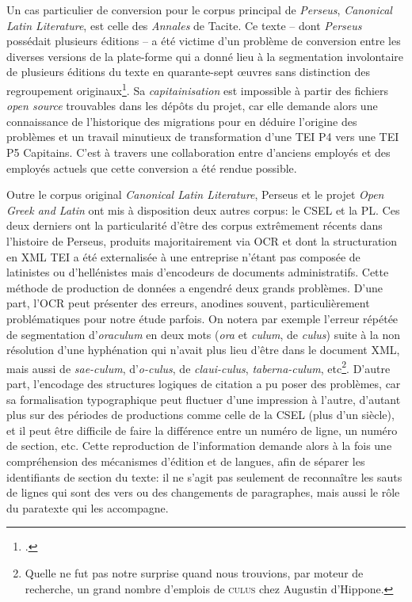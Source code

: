 Un cas particulier de conversion pour le corpus principal de \textit{Perseus}, \textit{Canonical Latin Literature}, est celle des \textit{Annales} de Tacite. Ce texte -- dont \textit{Perseus} possédait plusieurs éditions -- a été victime d'un problème de conversion entre les diverses versions de la plate-forme qui a donné lieu à la segmentation involontaire de plusieurs éditions du texte en quarante-sept œuvres sans distinction des regroupement originaux\footcite{noauthor_canonical_latinlitphi0660phi003perseus_lat2xml_nodate, clerice_phi0914phi001lat2_nodate}. Sa \textit{capitainisation} est impossible à partir des fichiers \textit{open source} trouvables dans les dépôts du projet, car elle demande alors une connaissance de l'historique des migrations pour en déduire l'origine des problèmes et un travail minutieux de transformation d'une TEI P4 vers une TEI P5 Capitains. C'est à travers une collaboration entre d'anciens employés et des employés actuels que cette conversion a été rendue possible.

Outre le corpus original \textit{Canonical Latin Literature}, Perseus et le projet \textit{Open Greek and Latin} ont mis à disposition deux autres corpus: le CSEL et la PL. Ces deux derniers ont la particularité d'être des corpus extrêmement récents dans l'histoire de Perseus, produits majoritairement via OCR et dont la structuration en XML TEI a été externalisée à une entreprise n'étant pas composée de latinistes ou d'hellénistes mais d'encodeurs de documents administratifs. Cette méthode de production de données a engendré deux grands problèmes. D'une part, l'OCR peut présenter des erreurs, anodines souvent, particulièrement problématiques pour notre étude parfois. On notera par exemple l'erreur répétée de segmentation d'\textit{oraculum} en deux mots (\textit{ora} et \textit{culum}, de \textit{culus}) suite à la non résolution d'une hyphénation qui n'avait plus lieu d'être dans le document XML, mais aussi de \textit{sae-culum}, d'\textit{o-culus}, de \textit{claui-culus}, \textit{taberna-culum}, etc\footnote{Quelle ne fut pas notre surprise quand nous trouvions, par moteur de recherche, un grand nombre d'emplois de \textsc{culus} chez Augustin d'Hippone.}. D'autre part, l'encodage des structures logiques de citation a pu poser des problèmes, car sa formalisation typographique peut fluctuer d'une impression à l'autre, d'autant plus sur des périodes de productions comme celle de la CSEL (plus d'un siècle), et il peut être difficile de faire la différence entre un numéro de ligne, un numéro de section, etc. Cette reproduction de l'information demande alors à la fois une compréhension des mécanismes d'édition et de langues, afin de séparer les identifiants de section du texte: il ne s'agit pas seulement de reconnaître les sauts de lignes qui sont des vers ou des changements de paragraphes, mais aussi le rôle du paratexte qui les accompagne.

